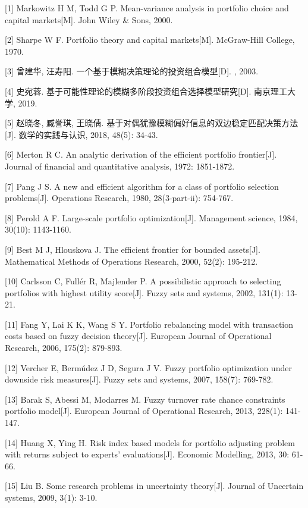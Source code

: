 \documentclass[]{article}
\begin{document}
{[}1{]} Markowitz H M, Todd G P. Mean-variance analysis in portfolio
choice and capital markets{[}M{]}. John Wiley \& Sons, 2000.

{[}2{]} Sharpe W F. Portfolio theory and capital markets{[}M{]}.
McGraw-Hill College, 1970.

{[}3{]} 曾建华, 汪寿阳. 一个基于模糊决策理论的投资组合模型{[}D{]}. ,
2003.

{[}4{]} 史宛蓉. 基于可能性理论的模糊多阶段投资组合选择模型研究{[}D{]}.
南京理工大学, 2019.

{[}5{]} 赵晓冬, 臧誉琪, 王晓倩.
基于对偶犹豫模糊偏好信息的双边稳定匹配决策方法{[}J{]}. 数学的实践与认识,
2018, 48(5): 34-43.

{[}6{]} Merton R C. An analytic derivation of the efficient portfolio
frontier{[}J{]}. Journal of financial and quantitative analysis, 1972:
1851-1872.

{[}7{]} Pang J S. A new and efficient algorithm for a class of portfolio
selection problems{[}J{]}. Operations Research, 1980, 28(3-part-ii):
754-767.

{[}8{]} Perold A F. Large-scale portfolio optimization{[}J{]}.
Management science, 1984, 30(10): 1143-1160.

{[}9{]} Best M J, Hlouskova J. The efficient frontier for bounded
assets{[}J{]}. Mathematical Methods of Operations Research, 2000, 52(2):
195-212.

{[}10{]} Carlsson C, Fullér R, Majlender P. A possibilistic approach to
selecting portfolios with highest utility score{[}J{]}. Fuzzy sets and
systems, 2002, 131(1): 13-21.

{[}11{]} Fang Y, Lai K K, Wang S Y. Portfolio rebalancing model with
transaction costs based on fuzzy decision theory{[}J{]}. European
Journal of Operational Research, 2006, 175(2): 879-893.

{[}12{]} Vercher E, Bermúdez J D, Segura J V. Fuzzy portfolio
optimization under downside risk measures{[}J{]}. Fuzzy sets and
systems, 2007, 158(7): 769-782.

{[}13{]} Barak S, Abessi M, Modarres M. Fuzzy turnover rate chance
constraints portfolio model{[}J{]}. European Journal of Operational
Research, 2013, 228(1): 141-147.

{[}14{]} Huang X, Ying H. Risk index based models for portfolio
adjusting problem with returns subject to experts' evaluations{[}J{]}.
Economic Modelling, 2013, 30: 61-66.

{[}15{]} Liu B. Some research problems in uncertainty theory{[}J{]}.
Journal of Uncertain systems, 2009, 3(1): 3-10.
\end{document}
